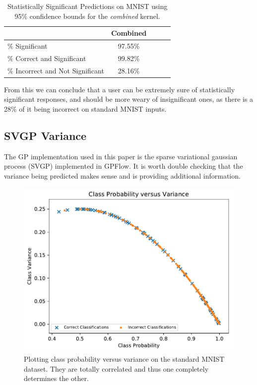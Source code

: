 \documentclass{article}
\begin{document}
\begin{table}[h]
\caption{Statistically Significant Predictions on MNIST using 95\% confidence bounds for the \textit{combined} kernel.}
\vskip 0.15in
\begin{center}
\begin{small}
\begin{sc}
\begin{tabular}{lcccr}
\toprule
							&  Combined  	\\
\midrule
\% Significant				& 97.55\%		\\
\% Correct and Significant  & 99.82\%  		\\
\% Incorrect and Not Significant & 28.16\% \\
\bottomrule
\end{tabular}
\end{sc}
\end{small}
\end{center}
\vskip -0.1in
\label{tab:statsig}
\end{table}

From this we can conclude that a user can be extremely sure of statistically significant responses, and should be more weary of insignificant ones, as there is a 28\% of it being incorrect on standard MNIST inputs.

\subsection{SVGP Variance}
\label{sec:svgp-variance}
The GP implementation used in this paper is the sparse variational gaussian process (SVGP) implemented in GPFlow. It is worth double checking that the variance being predicted makes sense and is providing additional information.

\begin{figure}[hbt]
\centering
\includegraphics[width=\hsize]{figures/mnist/mu_versus_var_combined.pdf}
\caption{Plotting class probability versus variance on the standard MNIST dataset. They are totally correlated and thus one completely determines the other.}
\label{fig:all_variances}
\end{figure}
\end{document}

